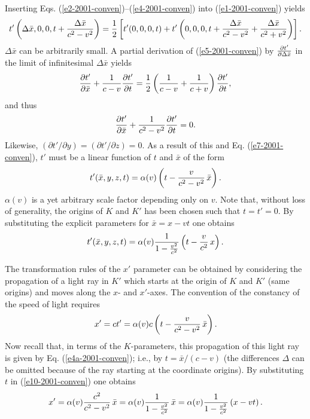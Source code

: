 Inserting Eqs.
(\ref{e2-2001-conven})--(\ref{e4-2001-conven})
into
(\ref{e1-2001-conven}) yields
\begin{equation}
t' \left( \Delta\bar{x},0,0,t+{\Delta \bar{x} \over c^2-v^2}\right )=
{1\over 2}\left[
t' (0,0,0,t)+
t' \left( 0,0,0,t+{\Delta \bar{x} \over c^2-v^2}+{\Delta \bar{x} \over c^2+v^2}\right )
\right].
\label{e5-2001-conven}
\end{equation}
$\Delta \bar{x}$ can be arbitrarily small.
A partial derivation of (\ref{e5-2001-conven}) by ${\partial t'\over \partial \Delta\bar{x}}$
in the limit of infinitesimal $\Delta \bar{x}$ yields
\begin{equation}
{\partial t'\over \partial \bar{x}}
+{1\over c-v}{\partial t'\over \partial t} =
{1\over 2}\left(
{1\over c-v}+{1\over c+v}
\right){\partial t' \over \partial t} ,
\label{e6-2001-conven}
\end{equation}
and thus
\begin{equation}
{\partial t'\over \partial \bar{x}}
+{1\over c^2-v^2}{\partial t'\over \partial t} = 0.
\label{e7-2001-conven}
\end{equation}
Likewise,
$
(\partial t'/ \partial y)
=
(\partial t'/ \partial z)
=0.
$
As a result of this and Eq. (\ref{e7-2001-conven}),
$t'$ must be a linear function of
$t$ and $\bar{x}$ of the form
\begin{equation}
t' ( \bar{x},y,z,t)= \alpha (v) \left(t-
{v\over c^2-v^2}\,\bar{x} \right) .
\label{e8-2001-conven}
\end{equation}
$\alpha (v)$ is a yet arbitrary scale factor depending only on $v$.
Note that, without loss of generality, the origins of $K$
and $K'$ has been chosen such that
$t=t'=0$.
By substituting the explicit parameters for $\bar{x}=x-vt$ one obtains
\begin{equation}
t' ( \bar{x},y,z,t)= \alpha (v)
{1 \over 1-{v^2\over c^2}}
\left(t-
{v\over c^2}\,x \right) .
\label{e9-2001-conven}
\end{equation}

The transformation rules of the $x'$ parameter can be obtained by
considering the propagation of a light ray in $K'$ which starts at the
origin of $K$ and $K'$ (same origins) and moves along the $x$- and
$x'$-axes. The convention of the constancy of the speed of light
requires
\begin{equation}
x'=ct' = \alpha (v) c\left(t-
{v\over c^2-v^2}\,\bar{x} \right).
\label{e10-2001-conven}
\end{equation}
Now recall that, in terms of the $K$-parameters, this propagation
of this light ray is given by Eq. (\ref{e4a-2001-conven}); i.e., by
$t=\bar{x}/(c-v)$ (the differences $\Delta$ can be omitted because of
the ray starting at the coordinate origins).
By substituting $t$ in (\ref{e10-2001-conven}) one obtains
\begin{equation}
x'
=
\alpha (v)
{c^2\over c^2-v^2}\,\bar{x}
=
\alpha (v)
{1 \over 1-{v^2\over c^2}}
\,\bar{x}
=
\alpha (v)
{1 \over 1-{v^2\over c^2}}
\left(x-vt\right)
.
\label{e11-2001-conven}
\end{equation}


